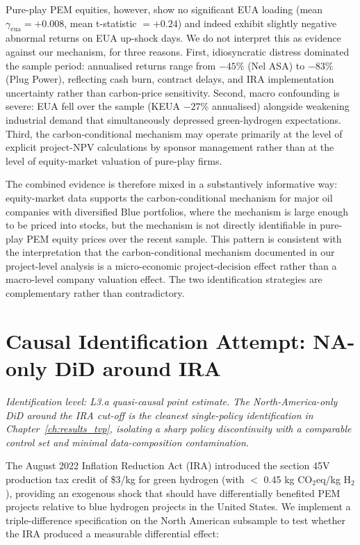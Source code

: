 Pure-play PEM equities, however, show no significant EUA loading (mean $\gamma_{\mathrm{eua}} = +0.008$, mean t-statistic $= +0.24$) and indeed exhibit slightly negative abnormal returns on EUA up-shock days. We do not interpret this as evidence against our mechanism, for three reasons. First, idiosyncratic distress dominated the sample period: annualised returns range from $-45\%$ (Nel ASA) to $-83\%$ (Plug Power), reflecting cash burn, contract delays, and IRA implementation uncertainty rather than carbon-price sensitivity. Second, macro confounding is severe: EUA fell over the sample (KEUA $-27\%$ annualised) alongside weakening industrial demand that simultaneously depressed green-hydrogen expectations. Third, the carbon-conditional mechanism may operate primarily at the level of explicit project-NPV calculations by sponsor management rather than at the level of equity-market valuation of pure-play firms.

The combined evidence is therefore mixed in a substantively informative way: equity-market data supports the carbon-conditional mechanism for major oil companies with diversified Blue portfolios, where the mechanism is large enough to be priced into stocks, but the mechanism is not directly identifiable in pure-play PEM equity prices over the recent sample. This pattern is consistent with the interpretation that the carbon-conditional mechanism documented in our project-level analysis is a micro-economic project-decision effect rather than a macro-level company valuation effect. The two identification strategies are complementary rather than contradictory.

\section{Causal Identification Attempt: NA-only DiD around IRA}
\noindent\emph{Identification level: L3.a quasi-causal point estimate. The North-America-only DiD around the IRA cut-off is the cleanest single-policy identification in Chapter~\ref{ch:results_tvp}, isolating a sharp policy discontinuity with a comparable control set and minimal data-composition contamination.}

\label{sec:ch7-did}

The August 2022 Inflation Reduction Act (IRA) introduced the section 45V production tax credit of \$3/kg for green hydrogen (with $<$ 0.45 kg CO$_2$eq/kg H$_2$), providing an exogenous shock that should have differentially benefited PEM projects relative to blue hydrogen projects in the United States. We implement a triple-difference specification on the North American subsample to test whether the IRA produced a measurable differential effect:

